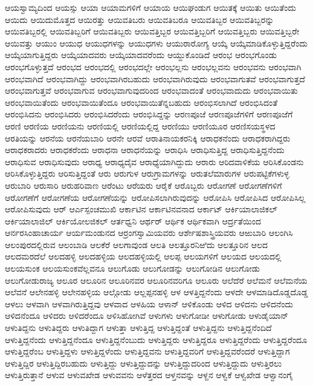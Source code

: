 {ಆಯಸ್ವಾಮ್ಯದಿಂದ
ಆಯಸ್ಸು
ಆಯಾ
ಆಯಾಮಗಳಿಗೆ
ಆಯಾಯ
ಆಯಿಘಂಡುಗ
ಆಯಿತಕ್ಕೆ
ಆಯಿತು
ಆಯಿತೆಂದು
ಆಯಿದು
ಆಯಿದುಮೊತ್ತದ
ಆಯಿರತ್ತು
ಆಯಿವತಿಬರು
ಆಯಿವತಿಬರೂ
ಆಯಿವತಿಬ್ಬರ
ಆಯಿವತಿಬ್ಬರನ್ನು
ಆಯಿವತಿಬ್ಬರಲ್ಲಿ
ಆಯಿವತಿಬ್ಬರಿಗೆ
ಆಯಿವತಿಬ್ಬರು
ಆಯಿವತ್ತಿಬ್ಬರ
ಆಯಿವತ್ತಿಬ್ಬರಿಗೆ
ಆಯಿವತ್ತಿಬ್ಬರು
ಆಯಿವತ್ತಿಬ್ಬರೇ
ಆಯಿವತ್ತು
ಆಯುಂ
ಆಯುಧ
ಆಯುಧಗಳನ್ನು
ಆಯುಧಗಳು
ಆಯುರಾರೋಗ್ಯ
ಆಯ್ಕೆ
ಆಯ್ಕೆಮಾಡಿಕೊಳ್ಳುತ್ತಿದ್ದರೆಂದು
ಆಯ್ಕೆಯಾಗುತ್ತಿದ್ದರು
ಆಯ್ಕೆಯಾದವರು
ಆಯ್ಕೆಯಾದವರೆಂದು
ಆಯ್ದುಕೊಂಡಿದೆ
ಆರಂಭ
ಆರಂಭಗೊಂಡು
ಆರಂಭಗೊಳ್ಳುತ್ತದೆ
ಆರಂಭದ
ಆರಂಭದಲ್ಲಿ
ಆರಂಭದಲ್ಲೇ
ಆರಂಭಲ್ಲನು
ಆರಂಭಲ್ಲವನು
ಆರಂಭವನು
ಆರಂಭವಾಗಿ
ಆರಂಭವಾಗಿದೆ
ಆರಂಭವಾಗಿದ್ದು
ಆರಂಭವಾಗಿರಬಹುದು
ಆರಂಭವಾಗಿರುವುದು
ಆರಂಭವಾಗುತವೆ
ಆರಂಭವಾಗುತ್ತದೆ
ಆರಂಭವಾಗುತ್ತವೆ
ಆರಂಭವಾಗುವ
ಆರಂಭವಾಗುವುದರಿಂದ
ಆರಂಭವಾದಂತೆ
ಆರಂಭವಾದುದು
ಆರಂಭವಾಯಿತು
ಆರಂಭವಾಯಿತೆಂದು
ಆರಂಭವಾಯಿತೆಂದೂ
ಆರಂಭವಾಯಿತೆನ್ನಬಹುದು
ಆರಂಭಿಸಲಾಗಿದೆ
ಆರಂಭಿಸಿದಂತೆ
ಆರಂಭಿಸಿದನು
ಆರಂಭಿಸಿದರು
ಆರಂಭಿಸಿದರೆಂದು
ಆರಂಭಿಸಿದ್ದನ್ನು
ಆರಣಪೂಜೆ
ಆರಣಪೂಜೆಗಳಿಗೆ
ಆರಣಪೂಜೆಗೆ
ಆರಣಿ
ಆರಣಿಯ
ಆರಣಿಯನು
ಆರಣಿಯಲ್ಲಿ
ಆರಣಿಯಲ್ಲಿದ್ದ
ಆರಣಿಯು
ಆರಣಿಯೂರ
ಆರಣಿಸಯಸ್ಥಳದ
ಆರತಿಯನ್ನು
ಆರನೆಯ
ಆರನೆಯಬಾರಿ
ಆರನೇ
ಆರವೆ
ಆರಾತಿನಾಯಕರನಿಕ್ಕಿ
ಆರಾಧಕನೆಂದು
ಆರಾಧಕರಾಗಿದ್ದರು
ಆರಾಧಕರಾದರು
ಆರಾಧಕರೆಂದು
ಆರಾಧನಾ
ಆರಾಧನೆಯನ್ನು
ಆರಾಧಿಸಿ
ಆರಾಧಿಸುತ್ತಿದ್ದ
ಆರಾಧಿಸುತ್ತಿದ್ದನೆಂದು
ಆರಾಧಿಸುವ
ಆರಾಧಿಸುವುದು
ಆರಾಧ್ಯ
ಆರಾಧ್ಯದೈವ
ಆರಾಧ್ಯೆಯಾಗಿದ್ದುದು
ಆರಾರು
ಆರಿದವಾಳಿಕೆಯ
ಆರಿಸಿಕೊಂಡನು
ಆರಿಸಿಕೊಳ್ಳುತ್ತಿದ್ದರು
ಆರಿಸುತ್ತಿದ್ದಂತೆ
ಆರು
ಆರುಗುಳ
ಆರುಗ್ರಾಮಗಳನ್ನು
ಆರುತಲೆಮಾರುಗಳ
ಆರುಪಟ್ಟಿಕೆಗಳುಳ್ಳ
ಆರುಬಾರಿ
ಆರುಸಾರಿ
ಆರುಹರಿವಾಣ
ಆರೆಂಟು
ಆರೆಯರು
ಆರೈಕೆ
ಆರೊಬ್ಬರು
ಆರೋಗಣೆ
ಆರೋಗಣೆಗಳಿಗೆ
ಆರೋಗಣೆಗೆ
ಆರೋಗಣೆಯ
ಆರೋಗಣೆಯನ್ನು
ಆರೋಪಿಸಲಾಗಿರುವುದನ್ನು
ಆರೋಪಿಸಿ
ಆರೋಪಿಸಿದ
ಆರೋಪಿಸಿಲ್ಲ
ಆರೋಪಿಸುವುದು
ಆರ್
ಆರ್ಎಸ್ಪಂಚಮುಖಿ
ಆರ್ಕಾಟಿನ
ಆರ್ಕಾಟಿನವನಾದ
ಆರ್ಕಾಟ್
ಆರ್ಕಿಯಾಲಾಜಿಕಲ್
ಆರ್ಕಿಯಾಲಾಜಿಲ್
ಆರ್ಕಿಯೋಲಜಿಕಲ್
ಆರ್ತಧ್ವನಿ
ಆರ್ಥರ್
ಆರ್ಥಿಕ
ಆರ್ಥಿಕವಾಗಿ
ಆರ್ದ್ರತೆಯಿಂದ
ಆರ್ನರಸಿಂಹಾಚಾರ್ಯ
ಆರ್ಯಮಂಡುನದ
ಆರ್ರಂಗಸ್ವಾಮಿಯವರು
ಆರ್ಶೇಷಶಾಸ್ತ್ರಿಯವರು
ಆಱುಬಾರಿ
ಆಲಂಗಿಸಿ
ಆಲಂಪುರದಲ್ಲಿರುವ
ಆಲಂಬಾಡಿ
ಆಲಕೆರೆ
ಆಲಗಾವುಂಡ
ಆಲತಿ
ಆಲತ್ತೂರನಿಱಿದು
ಆಲತ್ತೂರಿನ
ಆಲದ
ಆಲದಮರದೆಲೆ
ಆಲದಹಳ್ಳಿ
ಆಲದಹಳ್ಳಿಯ
ಆಲದಹಳ್ಳಿಯಲ್ಲಿ
ಆಲಪ್ಪ
ಆಲಯಗಳಿಗೆ
ಆಲಯದ
ಆಲಯದಲ್ಲಿ
ಆಲಯಸುಂಕ
ಆಲಯಸುಂಕವೆಲ್ಲವನೂ
ಆಲುಗೊಡು
ಆಲುಗೋಡನ್ನು
ಆಲುಗೋಡಿನ
ಆಲುಗೋಡು
ಆಲುಗೋಡುರಾಜ್ಯ
ಆಲೂರ
ಆಲೂರಿನ
ಆಲೂರಿನವರ
ಆಲೂರಿನವರಿಗೂ
ಆಲೂರು
ಆಲೆದೆರೆ
ಆಲೆಮನೆ
ಆಲೆಮನೆಯ
ಆಲೆವನೆ
ಆಲೇನಹಳ್ಳಿ
ಆಲೇನಹಳ್ಳಿಯ
ಆಲ್ಗೋಡು
ಆಲ್ಲಪ್ಪನಹಳ್ಳಿ
ಆಳ
ಆಳತ್ತಿದ್ದನೆಂದು
ಆಳದೇ
ಆಳಮಾಡಿದೊಡ್ಡದೊಡ್ಡ
ಆಳಲು
ಆಳವಾಗಿ
ಆಳವಾಗಿರುತ್ತಿದ್ದವು
ಆಳವಾದ
ಆಳಹಿಯ
ಆಳಾನ್
ಆಳಿಕೊಂಡು
ಆಳಿದ
ಆಳಿದನು
ಆಳಿದನೆಂದು
ಆಳಿದನೆಂದೂ
ಆಳಿದರು
ಆಳಿದರೆಂದೂ
ಆಳಿಸಿಹೋಗಿವೆ
ಆಳುಗಳು
ಆಳುಗೋಡೀ
ಆಳುಗೋಡು
ಆಳುಡೈಯಾನ್
ಆಳುತಿದ್ದನು
ಆಳುತಿದ್ದರು
ಆಳುತಿದ್ದಾಗ
ಆಳುತ್ತಾ
ಆಳುತ್ತಿದ್ದ
ಆಳುತ್ತಿದ್ದಂತೆ
ಆಳುತ್ತಿದ್ದನು
ಆಳುತ್ತಿದ್ದನೆಂದಿದೆ
ಆಳುತ್ತಿದ್ದನೆಂದು
ಆಳುತ್ತಿದ್ದನೆಂದೂ
ಆಳುತ್ತಿದ್ದನೆಂಬುದು
ಆಳುತ್ತಿದ್ದರು
ಆಳುತ್ತಿದ್ದರೂ
ಆಳುತ್ತಿದ್ದರೆಂದು
ಆಳುತ್ತಿದ್ದರೆಂದೂ
ಆಳುತ್ತಿದ್ದರೆಂಬ
ಆಳುತ್ತಿದ್ದಳು
ಆಳುತ್ತಿದ್ದಳೆಂದು
ಆಳುತ್ತಿದ್ದವನು
ಆಳುತ್ತಿದ್ದವರಿಗೆ
ಆಳುತ್ತಿದ್ದವರೆಂದರೆ
ಆಳುತ್ತಿದ್ದಾಗ
ಆಳುತ್ತಿದ್ದಿರ
ಆಳುತ್ತಿದ್ದಿರಬಹುದು
ಆಳುತ್ತಿದ್ದು
ಆಳುತ್ತಿದ್ದುದನ್ನು
ಆಳುತ್ತಿದ್ದುದರಿಂದ
ಆಳುತ್ತಿದ್ದುದು
ಆಳುತ್ತಿರಲು
ಆಳುತ್ತಿರುತ್ತಾನೆ
ಆಳುವ
ಆಳುವಖೇಡ
ಆಳುವವನು
ಆಳೆತ್ತರದ
ಆಳ್ತನವನ್ನು
ಆಳ್ದನ
ಆಳ್ವಕೆ
ಆಳ್ವಖೇಡ
ಆಳ್ವಾನಂಗೈ
}
